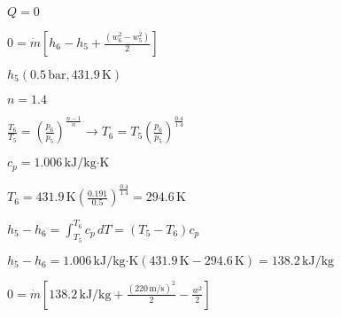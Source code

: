 \( Q = 0 \)  

\( 0 = \dot{m} \left[ h_6 - h_5 + \frac{(w_6^2 - w_5^2)}{2} \right] \)  

\( h_5 (0.5 \, \text{bar}, 431.9 \, \text{K}) \)  

\( n = 1.4 \)  

\( \frac{T_6}{T_5} = \left( \frac{p_6}{p_5} \right)^{\frac{n-1}{n}} \rightarrow T_6 = T_5 \left( \frac{p_6}{p_5} \right)^{\frac{0.4}{1.4}} \)  

\( c_p = 1.006 \, \text{kJ/kg·K} \)  

\( T_6 = 431.9 \, \text{K} \left( \frac{0.191}{0.5} \right)^{\frac{0.4}{1.4}} = 294.6 \, \text{K} \)  

\( h_5 - h_6 = \int_{T_5}^{T_6} c_p \, dT = (T_5 - T_6) c_p \)  

\( h_5 - h_6 = 1.006 \, \text{kJ/kg·K} \left( 431.9 \, \text{K} - 294.6 \, \text{K} \right) = 138.2 \, \text{kJ/kg} \)  

\( 0 = \dot{m} \left[ 138.2 \, \text{kJ/kg} + \frac{(220 \, \text{m/s})^2}{2} - \frac{w^2}{2} \right] \)